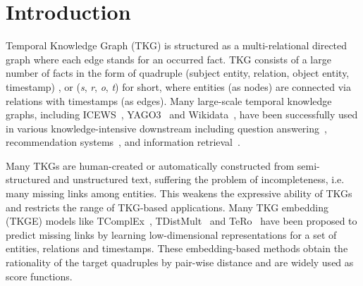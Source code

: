 \documentclass[sigconf]{acmart}
\begin{document}


\maketitle

\setlength{\parskip}{0.2cm plus4mm minus3mm}
\section{Introduction}
Temporal Knowledge Graph (TKG) is structured as a multi-relational directed graph where each edge
stands for an occurred fact.
TKG consists of a large number of facts in the form of quadruple (subject entity, relation, object entity, timestamp) , or (\emph{s}, \emph{r}, \emph{o}, \emph{t}) for short, where entities (as nodes) are connected via relations with timestamps (as edges). Many large-scale temporal knowledge graphs, including ICEWS~\citep{ICEWS}, YAGO3~\citep{YAGO3} and Wikidata~\citep{Wikidata}, have been successfully used in various knowledge-intensive downstream including question answering~\citep{saxena-etal-2021-question, Sun2020FaithfulEF, 10.1145/3184558.3191536, 10.1145/3269206.3269247}, 
recommendation systems~\citep{Wang2019MultiTaskFL,qertredd,asdfwef,Zhao2019CrossDomainRV}, and information retrieval~\citep{ zhang-etal-2019-long, 10.5555/3524938.3525667}.
\par
Many TKGs are human-created or automatically constructed from semi-structured and unstructured text, suffering the problem of incompleteness, i.e. many missing links among entities. This weakens the expressive ability of TKGs and restricts the range of TKG-based applications. Many TKG embedding (TKGE) models like TComplEx~\citep{TComplEx}, TDistMult~\citep{TDistMult} and TeRo~\citep{TeRo} have been proposed to predict missing links by learning low-dimensional representations for a set of entities, relations and timestamps. These embedding-based methods obtain the rationality of the target quadruples by pair-wise distance and are widely used as score functions.
\par
\end{document}
